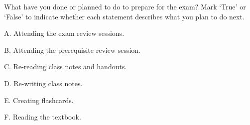 \documentclass{ximera}
\begin{document}
\begin{question}
    What have you done or planned to do to prepare for the exam? Mark `True' or `False' to indicate whether each statement describes what you plan to do next.

\begin{question}
    A. Attending the exam review sessions.
    \begin{multipleChoice}
    \end{multipleChoice}
\end{question}

\begin{question}
    B. Attending the prerequisite review session.
    \begin{multipleChoice}
    \end{multipleChoice}
\end{question}

\begin{question}
    C. Re-reading class notes and handouts.
    \begin{multipleChoice}
    \end{multipleChoice}
\end{question}

\begin{question}
    D. Re-writing class notes.
    \begin{multipleChoice}
    \end{multipleChoice}
\end{question}

\begin{question}
    E. Creating flashcards.
    \begin{multipleChoice}
    \end{multipleChoice}
\end{question}

\begin{question}
    F. Reading the textbook.
    \begin{multipleChoice}
    \end{multipleChoice}
\end{question}


\end{question}
\end{document}
